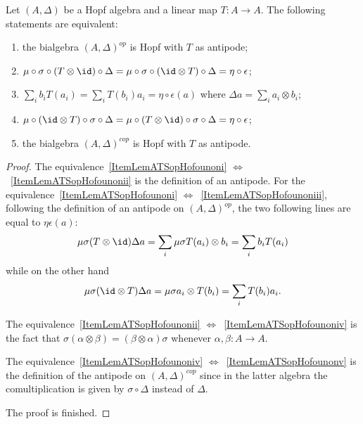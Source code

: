 \begin{lemma}       \label{LemATSopHofounon}
	Let \( (A,\Delta)\) be a Hopf algebra and a linear map \( T\colon A\to A\). The following statements are equivalent:
	\begin{enumerate}
		\item\label{ItemLemATSopHofounoni}
		the bialgebra \( (A,\Delta)^{op}\) is Hopf with \( T\) as antipode;
		\item\label{ItemLemATSopHofounonii}
		\( \mu\circ\sigma\circ(T\otimes\id)\circ\Delta=\mu\circ\sigma\circ(\id\otimes T)\circ\Delta=\eta\circ\epsilon\);
		\item\label{ItemLemATSopHofounoniii}
		\( \sum_i b_iT(a_i)=\sum_i T(b_i)a_i=\eta\circ\epsilon(a)\) where \( \Delta a=\sum_i a_i\otimes b_i\);
		\item\label{ItemLemATSopHofounoniv}
		\( \mu\circ(\id\otimes T)\circ\sigma\circ\Delta=\mu\circ(T\otimes\id)\circ\sigma\circ\Delta=\eta\circ\epsilon\);
		\item\label{ItemLemATSopHofounonv}
		the bialgebra \( (A,\Delta)^{cop}\) is Hopf with \( T\) as antipode.
	\end{enumerate}
\end{lemma}

\begin{proof}
	The equivalence~\ref{ItemLemATSopHofounoni} \( \Leftrightarrow\)~\ref{ItemLemATSopHofounonii} is the definition of an antipode. For the equivalence~\ref{ItemLemATSopHofounoni} \( \Leftrightarrow\)~\ref{ItemLemATSopHofounoniii}, following the definition of an antipode on \( (A,\Delta)^{op}\), the two following lines are equal to \( \eta\epsilon(a)\):
	\begin{equation}
		\mu\sigma(T\otimes \id)\Delta a=\sum_i\mu\sigma T(a_i)\otimes b_i=\sum_i b_i T(a_i)
	\end{equation}
	while on the other hand
	\begin{equation}
		\mu\sigma(\id\otimes T)\Delta a=\mu\sigma a_i\otimes T(b_i)=\sum_i T(b_i)a_i.
	\end{equation}

	The equivalence~\ref{ItemLemATSopHofounonii} \( \Leftrightarrow\)~\ref{ItemLemATSopHofounoniv} is the fact that \( \sigma(\alpha\otimes\beta)=(\beta\otimes \alpha)\sigma\) whenever \( \alpha,\beta\colon A\to A\).

	The equivalence~\ref{ItemLemATSopHofounoniv} \( \Leftrightarrow\)~\ref{ItemLemATSopHofounonv} is the definition of the antipode on \( (A,\Delta)^{cop}\) since in the latter algebra the comultiplication is given by \( \sigma\circ\Delta\) instead of \( \Delta\).

	The proof is finished.
\end{proof}

